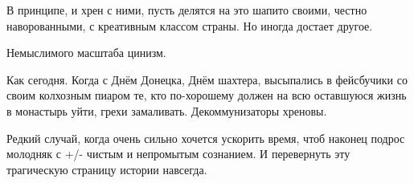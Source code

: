 В принципе, и хрен с ними, пусть делятся на это шапито своими, честно
наворованными, с креативным классом страны. Но иногда достает другое. 

Немыслимого масштаба цинизм.

Как сегодня. Когда с Днём Донецка, Днём шахтера, высыпались в фейсбучики со
своим колхозным пиаром те, кто по-хорошему должен на всю оставшуюся жизнь в
монастырь уйти, грехи замаливать. Декоммунизаторы хреновы.

Редкий случай, когда очень сильно хочется ускорить время, чтоб наконец подрос
молодняк с +/- чистым и непромытым сознанием. И перевернуть эту трагическую
страницу истории навсегда.

